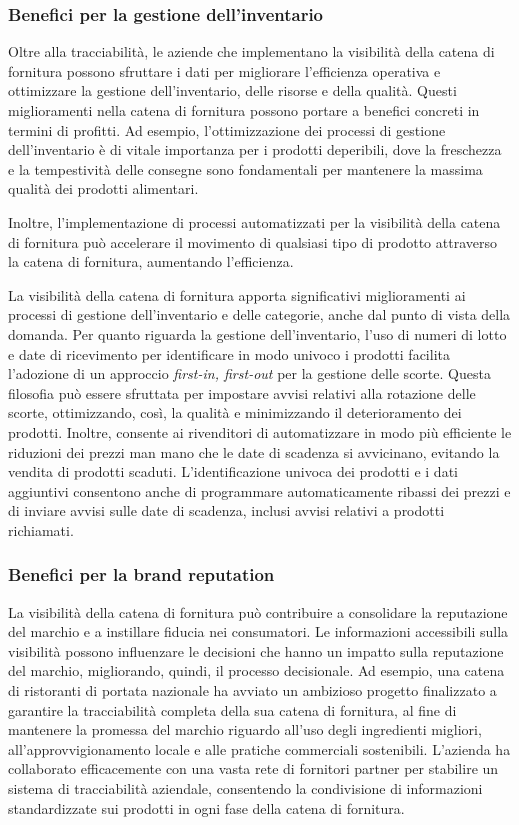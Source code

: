 \subsubsection{Benefici per la gestione dell'inventario}

Oltre alla tracciabilità, le aziende che implementano la visibilità della catena di fornitura possono sfruttare i dati per migliorare l'efficienza operativa e ottimizzare la gestione dell'inventario, delle risorse e della qualità. Questi miglioramenti nella catena di fornitura possono portare a benefici concreti in termini di profitti. Ad esempio, l'ottimizzazione dei processi di gestione dell'inventario è di vitale importanza per i prodotti deperibili, dove la freschezza e la tempestività delle consegne sono fondamentali per mantenere la massima qualità dei prodotti alimentari.

Inoltre, l'implementazione di processi automatizzati per la visibilità della catena di fornitura può accelerare il movimento di qualsiasi tipo di prodotto attraverso la catena di fornitura, aumentando l'efficienza.

La visibilità della catena di fornitura apporta significativi miglioramenti ai processi di gestione dell'inventario e delle categorie, anche dal punto di vista della domanda. Per quanto riguarda la gestione dell'inventario, l'uso di numeri di lotto e date di ricevimento per identificare in modo univoco i prodotti facilita l'adozione di un approccio \textit{first-in, first-out} per la gestione delle scorte. Questa filosofia può essere sfruttata per impostare avvisi relativi alla rotazione delle scorte, ottimizzando, così, la qualità e minimizzando il deterioramento dei prodotti. Inoltre, consente ai rivenditori di automatizzare in modo più efficiente le riduzioni dei prezzi man mano che le date di scadenza si avvicinano, evitando la vendita di prodotti scaduti. L'identificazione univoca dei prodotti e i dati aggiuntivi consentono anche di programmare automaticamente ribassi dei prezzi e di inviare avvisi sulle date di scadenza, inclusi avvisi relativi a prodotti richiamati.

\subsubsection{Benefici per la brand reputation}

La visibilità della catena di fornitura può contribuire a consolidare la reputazione del marchio e a instillare fiducia nei consumatori. Le informazioni accessibili sulla visibilità possono influenzare le decisioni che hanno un impatto sulla reputazione del marchio, migliorando, quindi, il processo decisionale. Ad esempio, una catena di ristoranti di portata nazionale ha avviato un ambizioso progetto finalizzato a garantire la tracciabilità completa della sua catena di fornitura, al fine di mantenere la promessa del marchio riguardo all'uso degli ingredienti migliori, all'approvvigionamento locale e alle pratiche commerciali sostenibili. L'azienda ha collaborato efficacemente con una vasta rete di fornitori partner per stabilire un sistema di tracciabilità aziendale, consentendo la condivisione di informazioni standardizzate sui prodotti in ogni fase della catena di fornitura.

